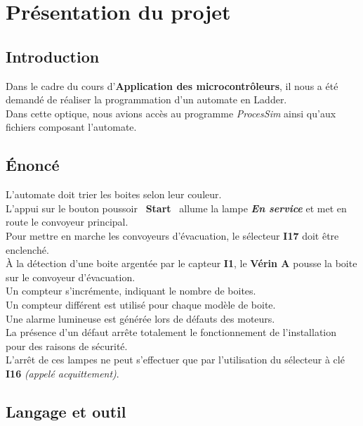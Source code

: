 \section{Présentation du projet}
\label{sec:presentation}


\subsection{Introduction}
\label{sec:intro}

Dans le cadre du cours d'\textbf{Application des microcontrôleurs}, il nous a été demandé de réaliser la programmation d'un automate en Ladder.\\
Dans cette optique, nous avions accès au programme \textit{ProcesSim} ainsi qu'aux fichiers composant l'automate.


\subsection{Énoncé}
\label{sec:enonce}

L'automate doit trier les boites selon leur couleur.\\

L'appui sur le bouton poussoir \guillemotleft \ \textbf{Start} \guillemotright \ allume la lampe \textbf{\textit{En service}} et met en route le convoyeur principal.\\

Pour mettre en marche les convoyeurs d'évacuation, le sélecteur \textbf{I17} doit être enclenché.\\

À la détection d'une boite argentée par le capteur \textbf{I1}, le \textbf{Vérin A} pousse la boite sur le convoyeur d'évacuation.\\
Un compteur s'incrémente, indiquant le nombre de boites.\\
Un compteur différent est utilisé pour chaque modèle de boite.\\

Une alarme lumineuse est générée lors de défauts des moteurs.\\
La présence d'un défaut arrête totalement le fonctionnement de l'installation pour des raisons de sécurité.\\

L'arrêt de ces lampes ne peut s'effectuer que par l'utilisation du sélecteur à clé \textbf{I16} \textit{(appelé acquittement)}.

\newpage

\subsection{Langage et outil}
\label{sec:langages}

